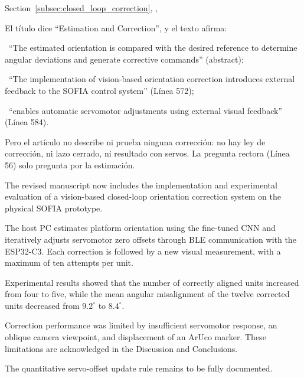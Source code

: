 \documentclass{LabDSTresponse}
\begin{document}
	
	
	{Section~\ref{subsec:closed_loop_correction},
		,
		}
	{El título dice ``Estimation and Correction'',
		y el texto afirma:
		
		\par\noindent\textbullet\ ``The estimated
		orientation is compared with the desired
		reference to determine angular deviations
		and generate corrective commands''
		(abstract);
		
		\par\noindent\textbullet\ ``The implementation
		of vision-based orientation correction
		introduces external feedback to the
		SOFIA control system'' (Línea 572);
		
		\par\noindent\textbullet\ ``enables automatic
		servomotor adjustments using external
		visual feedback'' (Línea 584).
		
		\par Pero el artículo no describe ni prueba
		ninguna corrección: no hay ley de corrección,
		ni lazo cerrado, ni resultado con servos.
		La pregunta rectora (Línea 56) solo
		pregunta por la estimación.}
	{
		The revised manuscript now includes the
		implementation and experimental evaluation
		of a vision-based closed-loop orientation
		correction system on the physical SOFIA
		prototype.
		
		The host PC estimates platform orientation
		using the fine-tuned CNN and iteratively
		adjusts servomotor zero offsets through
		BLE communication with the ESP32-C3.
		Each correction is followed by a new
		visual measurement, with a maximum of
		ten attempts per unit.
		
		Experimental results showed that the
		number of correctly aligned units increased
		from four to five, while the mean angular
		misalignment of the twelve corrected units
		decreased from $9.2^\circ$ to $8.4^\circ$.
		
		Correction performance was limited by
		insufficient servomotor response, an
		oblique camera viewpoint, and displacement
		of an ArUco marker. These limitations
		are acknowledged in the Discussion and
		Conclusions.
		
		The quantitative servo-offset update
		rule remains to be fully documented.
	}
	
\end{document}
